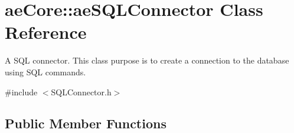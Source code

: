 \hypertarget{classae_core_1_1ae_s_q_l_connector}{}\section{ae\+Core\+:\+:ae\+S\+Q\+L\+Connector Class Reference}
\label{classae_core_1_1ae_s_q_l_connector}


A S\+QL connector. This class purpose is to create a connection to the database using S\+QL commands.  




{\ttfamily \#include $<$S\+Q\+L\+Connector.\+h$>$}

\subsection*{Public Member Functions}
